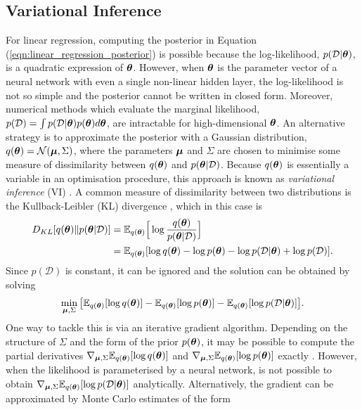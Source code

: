 \documentclass[10pt]{article} %
\begin{document}
\subsection{Variational Inference}\label{sec:vi}
For linear regression, computing the posterior in Equation (\ref{eqn:linear_regression_posterior}) is possible because the log-likelihood, $p(\mathcal{D} | {\bm{\theta}})$, is a quadratic expression of ${\bm{\theta}}$. However, when ${\bm{\theta}}$ is the parameter vector of a neural network with even a single non-linear hidden layer, the log-likelihood is not so simple and the posterior cannot be written in closed form. Moreover, numerical methods which evaluate the marginal likelihood, $p(\mathcal{D}) = \int p(\mathcal{D} | {\bm{\theta}}) p({\bm{\theta}}) d{\bm{\theta}}$, are intractable for high-dimensional ${\bm{\theta}}$. An alternative strategy is to approximate the posterior with a Gaussian distribution, $q({\bm{\theta}}) = \mathcal{N}({\bm{\mu}}, \Sigma)$, where the parameters ${\bm{\mu}}$ and $\Sigma$ are chosen to minimise some measure of dissimilarity between $q({\bm{\theta}})$ and $p({\bm{\theta}} | \mathcal{D})$. Because $q({\bm{\theta}})$ is essentially a variable in an optimisation procedure, this approach is known as \emph{variational inference} (VI) \citep{barber2007}. A common measure of dissimilarity between two distributions is the Kullback-Leibler (KL) divergence \cite{barber2007}, which in this case is
\begin{align}
\begin{split}
	D_{KL}[q({\bm{\theta}}) \Vert p({\bm{\theta}} | \mathcal{D})] 
	& = \mathbb{E}_{q({\bm{\theta}})} \Big[\log \frac{q({\bm{\theta}})}{p({\bm{\theta}} | \mathcal{D})}\Big] \\
	& = \mathbb{E}_{q({\bm{\theta}})} [\log q({\bm{\theta}}) - \log p({\bm{\theta}}) - \log p(\mathcal{D} | {\bm{\theta}}) + \log p(\mathcal{D})].
\end{split}
\end{align}
Since $p(\mathcal{D})$ is constant, it can be ignored and the solution can be obtained by solving 
\begin{equation}\label{eqn:vi_objective}
	\min_{{\bm{\mu}}, \Sigma} \big[ \mathbb{E}_{q({\bm{\theta}})} [\log q({\bm{\theta}})] - \mathbb{E}_{q({\bm{\theta}})} [\log p({\bm{\theta}}) ] - \mathbb{E}_{q({\bm{\theta}})} [\log p(\mathcal{D} | {\bm{\theta}})] \big].
\end{equation}
One way to tackle this is via an iterative gradient algorithm. Depending on the structure of $\Sigma$ and the form of the prior $p({\bm{\theta}})$, it may be possible to compute the partial derivatives $\nabla_{{\bm{\mu}}, \Sigma} \mathbb{E}_{q({\bm{\theta}})} [\log q({\bm{\theta}})]$ and $\nabla_{{\bm{\mu}}, \Sigma} \mathbb{E}_{q({\bm{\theta}})} [\log p({\bm{\theta}}) ]$ exactly \citep{kingma2013}. However, when the likelihood is parameterised by a neural network, is not possible to obtain $ \nabla_{{\bm{\mu}}, \Sigma}\mathbb{E}_{q({\bm{\theta}})} [\log p(\mathcal{D} | {\bm{\theta}})]$ analytically. Alternatively, the gradient can be approximated by Monte Carlo estimates of the form 
\end{document}
